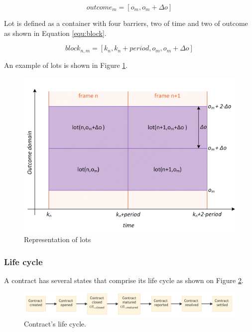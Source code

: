 \documentclass{article}
\begin{document}
	\begin{equation}
		outcome_m=[o_m, o_m+\Delta o]
		\label{equ:sets}
	\end{equation}
	
	Lot is defined as a container with four barriers, two of time and two of outcome as shown in Equation \ref{equ:block}.
	
	\begin{equation}
		block_{n,m}=[k_n, k_{n}+period, o_m, o_m+\Delta o]
		\label{equ:block}
	\end{equation}
	
	An example of lots is shown in Figure \ref{fig:lots}.
	
	\begin{figure}[h]
		\centering
		\includegraphics[scale=0.7]{images/lots.png}
		\caption{Representation of lots}
		\label{fig:lots}
	\end{figure}
	
	\subsubsection*{Life cycle}
	
	A contract has several states that comprise its life cycle as shown on Figure \ref{fig:contractLifeCycle}. 
	
	\begin{figure}[h]
		\centering
		\includegraphics[width=\linewidth]{images/contractLifeCycle.png}
		\caption{Contract's life cycle.}
		\label{fig:contractLifeCycle}
	\end{figure}
	
\end{document}
